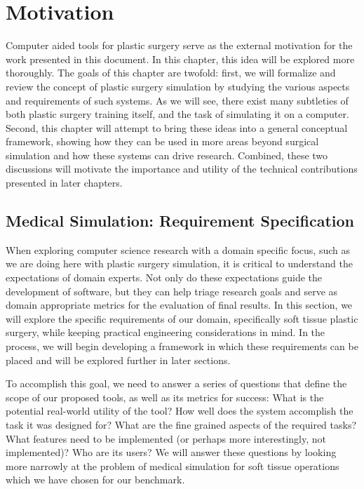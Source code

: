 
\chapter{Motivation}
\label{chp:motivation}

Computer aided tools for plastic surgery serve as the external
motivation for the work presented in this document. In this chapter,
this idea will be explored more thoroughly. The goals of this chapter
are twofold: first, we will formalize and review the concept of
plastic surgery simulation by studying the various aspects and
requirements of such systems. As we will see, there exist many
subtleties of both plastic surgery training itself, and the task of
simulating it on a computer. Second, this chapter will attempt to
bring these ideas into a general conceptual framework, showing how
they can be used in more areas beyond surgical simulation and how
these systems can drive research. Combined, these two discussions will
motivate the importance and utility of the technical contributions
presented in later chapters.

\section{Medical Simulation: Requirement Specification}

When exploring computer science research with a domain specific focus,
such as we are doing here with plastic surgery simulation, it is
critical to understand the expectations of domain experts. Not only do
these expectations guide the development of software, but they can
help triage research goals and serve as domain appropriate metrics for
the evaluation of final results. In this section, we will explore the
specific requirements of our domain, specifically soft tissue plastic
surgery, while keeping practical engineering considerations in
mind. In the process, we will begin developing a framework in
which these requirements can be placed and will be explored further in
later sections.

To accomplish this goal, we need to answer a series of questions that
define the scope of our proposed tools, as well as its metrics for
success: What is the potential real-world utility of the tool? How
well does the system accomplish the task it was designed for?  What
are the fine grained aspects of the required tasks? What features need
to be implemented (or perhaps more interestingly, not implemented)? Who
are its users? We will answer these questions by looking more narrowly
at the problem of medical simulation for soft tissue operations which
we have chosen for our benchmark.

